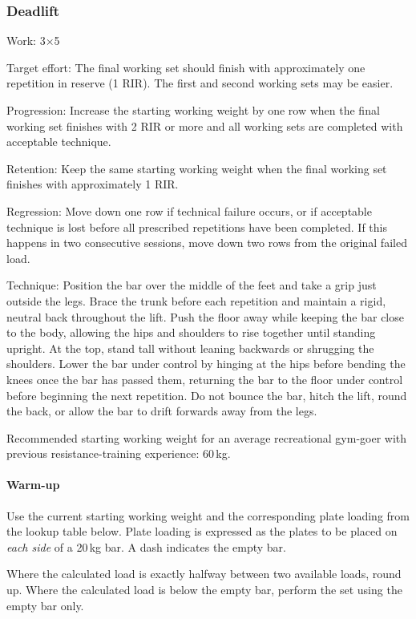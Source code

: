 \documentclass[11pt,a4paper]{article}
\begin{document}
\newpage
\subsubsection{Deadlift}

Work: 3$\times$5

Target effort: The final working set should finish with approximately one repetition in reserve (1 RIR). The first and second working sets may be easier.

Progression: Increase the starting working weight by one row when the final working set finishes with 2 RIR or more and all working sets are completed with acceptable technique.

Retention: Keep the same starting working weight when the final working set finishes with approximately 1 RIR.

Regression: Move down one row if technical failure occurs, or if acceptable technique is lost before all prescribed repetitions have been completed. If this happens in two consecutive sessions, move down two rows from the original failed load.

Technique: Position the bar over the middle of the feet and take a grip just outside the legs. Brace the trunk before each repetition and maintain a rigid, neutral back throughout the lift. Push the floor away while keeping the bar close to the body, allowing the hips and shoulders to rise together until standing upright. At the top, stand tall without leaning backwards or shrugging the shoulders. Lower the bar under control by hinging at the hips before bending the knees once the bar has passed them, returning the bar to the floor under control before beginning the next repetition. Do not bounce the bar, hitch the lift, round the back, or allow the bar to drift forwards away from the legs.

Recommended starting working weight for an average recreational gym-goer with previous resistance-training experience: 60\,kg.

\paragraph{Warm-up}

Use the current starting working weight and the corresponding plate loading from the lookup table below. Plate loading is expressed as the plates to be placed on \emph{each side} of a 20\,kg bar. A dash indicates the empty bar.

Where the calculated load is exactly halfway between two available loads, round up. Where the calculated load is below the empty bar, perform the set using the empty bar only.
\end{document}
